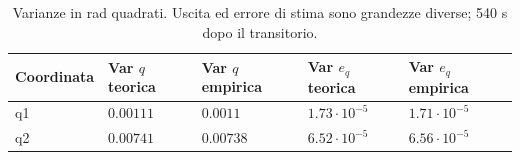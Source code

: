\begin{table}[htbp]\centering\small
\begin{tabular}{lllll}\toprule
Coordinata & Var $q$ teorica & Var $q$ empirica & Var $e_q$ teorica & Var $e_q$ empirica\\\midrule
q1 & $0.00111$ & $0.0011$ & $1.73\cdot10^{-5}$ & $1.71\cdot10^{-5}$\\
q2 & $0.00741$ & $0.00738$ & $6.52\cdot10^{-5}$ & $6.56\cdot10^{-5}$\\
\bottomrule\end{tabular}
\caption{Varianze in rad quadrati. Uscita ed errore di stima sono grandezze diverse; 540 s dopo il transitorio.}
\end{table}
